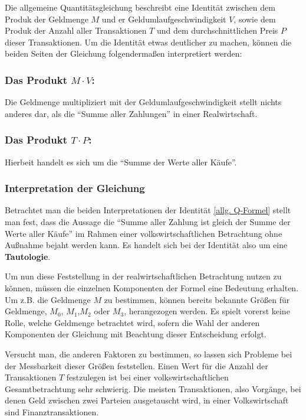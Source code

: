 Die allgemeine Quantitätsgleichung beschreibt eine Identität zwischen dem Produk der Geldmenge $M$ und er Geldumlaufgeschwindigkeit $V$, sowie dem Produk der Anzahl aller Transaktionen $T$ und dem durchschnittlichen Preis $P$ dieser Transaktionen. Um die Identität etwas deutlicher zu machen, können die beiden Seiten der Gleichung folgendermaßen interpretiert werden:

\subsubsection*{Das Produkt $M \cdot V$:}
Die Geldmenge multipliziert mit der Geldumlaufgeschwindigkeit stellt nichts anderes dar, als die \enquote{Summe aller Zahlungen} in einer Realwirtschaft.

\subsubsection*{Das Produkt $T \cdot P$:}
Hierbeit handelt es sich um die \enquote{Summe der Werte aller Käufe}.

\subsubsection*{Interpretation der Gleichung}
Betrachtet man die beiden Interpretationen der Identität \vref{allg. Q-Formel} stellt man fest, dass die Aussage die \enquote{Summe aller Zahlung ist gleich der Summe der Werte aller Käufe} im Rahmen einer volkswirtschaftlichen Betrachtung ohne Außnahme bejaht werden kann. Es handelt sich bei der Identität also um eine \textbf{Tautologie}.

Um nun diese Feststellung in der realwirtschaftlichen Betrachtung nutzen zu können, müssen die einzelnen Komponenten der Formel eine Bedeutung erhalten. Um z.B. die Geldmenge $M$ zu bestimmen, können bereits bekannte Größen für Geldmenge, $M_0$, $M_1$,$M_2$ oder $M_3$, herangezogen werden. Es spielt vorerst keine Rolle, welche Geldmenge betrachtet wird, sofern die Wahl der anderen Komponenten der Gleichung mit Beachtung dieser Entscheidung erfolgt.

Versucht man, die anderen Faktoren zu bestimmen, so lassen sich Probleme bei der Messbarkeit dieser Größen feststellen. Einen Wert für die Anzahl der Transaktionen $T$ festzulegen ist bei einer volkswirtschaftlichen Gesamtbetrachtung sehr schwierig. Die meisten Transaktionen, also Vorgänge, bei denen Geld zwischen zwei Parteien ausgetauscht wird, in einer Volkswirtschaft sind Finanztransaktionen.

